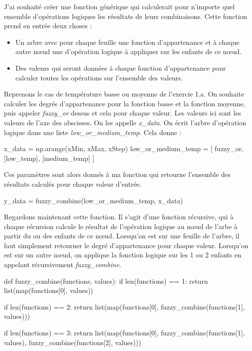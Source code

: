 \documentclass[11pt]{report}
\begin{document}
J'ai souhaité créer une fonction générique qui calculerait pour n'importe quel ensemble d'opérations logiques les résultats de leurs combinaisons. Cette fonction prend en entrée deux choses :
\begin{itemize}
\item Un arbre avec pour chaque feuille une fonction d'appartenance et à chaque autre nœud une d'opération logique à appliquer sur les enfants de ce nœud.
\item Des valeurs qui seront données à chaque fonction d'appartenance pour calculer toutes les opérations sur l'ensemble des valeurs.
\end{itemize}
Reprenons le cas de température basse ou moyenne de l'exercie 1.a. On souhaite calculer les degrés d'appartenance pour la fonction basse et la fonction moyenne, puis appeler \textit{fuzzy\_or} dessus et cela pour chaque valeur. Les valeurs ici sont les valeurs de l'axe des abscisses. On les appelle \textit{x\_data}. On écrit l'arbre d'opération logique dans une liste \textit{low\_or\_medium\_temp}. Cela donne :
\begin{pythoncode}
x_data = np.arange(xMin, xMax, xStep)
low_or_medium_temp = [
	fuzzy_or,
	[low_temp],
	[medium_temp]
]
\end{pythoncode}

Ces paramètres sont alors donnés à ma fonction qui retourne l'ensemble des résultats calculés pour chaque valeur d'entrée.
\begin{pythoncode}
y_data = fuzzy_combine(low_or_medium_temp, x_data)
\end{pythoncode}

Regardons maintenant cette fonction. Il s'agit d'une fonction récursive, qui à chaque récursion calcule le résultat de l'opération logique au nœud de l'arbe à partir du ou des enfants de ce nœud.
Lorsqu'on est sur une feuille de l'arbre, il faut simplement retourner le degré d'appartenance pour chaque valeur.
Lorsqu'on est sur un autre nœud, on applique la fonction logique sur les 1 ou 2 enfants en appelant récursivement \textit{fuzzy\_combine}.
\begin{pythoncode}
def fuzzy_combine(functions, values):
	if len(functions) == 1:
		return list(map(functions[0], values))

	if len(functions) == 2:
		return list(map(functions[0], fuzzy_combine(functions[1], values)))

	if len(functions) == 3:
		return list(map(functions[0], fuzzy_combine(functions[1], values), fuzzy_combine(functions[2], values)))
\end{pythoncode}
\end{document}
